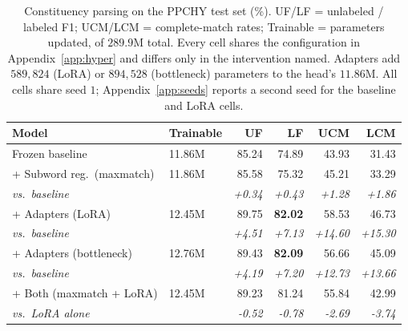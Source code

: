 \documentclass[11pt]{article}
\begin{document}
\begin{table}[t]
\centering
\small
\setlength{\tabcolsep}{5pt}
\begin{tabular}{@{}llrrrr@{}}
\toprule
\textbf{Model} & \textbf{Trainable} & \textbf{UF} & \textbf{LF} & \textbf{UCM} & \textbf{LCM} \\
\midrule
Frozen baseline              & 11.86M & 85.24 & 74.89 & 43.93 & 31.43 \\
\midrule
+ Subword reg.\ (maxmatch)   & 11.86M & 85.58 & 75.32 & 45.21 & 33.29 \\
\quad \emph{vs.\ baseline}   &        & \emph{+0.34} & \emph{+0.43} & \emph{+1.28} & \emph{+1.86} \\
\midrule
+ Adapters (LoRA)            & 12.45M & 89.75 & \textbf{82.02} & 58.53 & 46.73 \\
\quad \emph{vs.\ baseline}   &        & \emph{+4.51} & \emph{+7.13} & \emph{+14.60} & \emph{+15.30} \\
+ Adapters (bottleneck)      & 12.76M & 89.43 & \textbf{82.09} & 56.66 & 45.09 \\
\quad \emph{vs.\ baseline}   &        & \emph{+4.19} & \emph{+7.20} & \emph{+12.73} & \emph{+13.66} \\
\midrule
+ Both (maxmatch + LoRA)     & 12.45M & 89.23 & 81.24 & 55.84 & 42.99 \\
\quad \emph{vs.\ LoRA alone}  &        & \emph{-0.52} & \emph{-0.78} & \emph{-2.69} & \emph{-3.74} \\
\bottomrule
\end{tabular}
\caption{Constituency parsing on the PPCHY test set (\%). UF/LF = unlabeled /
labeled F1; UCM/LCM = complete-match rates; Trainable = parameters updated, of
$289.9$M total. Every cell shares the configuration in
Appendix~\ref{app:hyper} and differs only in the intervention named.
Adapters add $589{,}824$ (LoRA) or $894{,}528$ (bottleneck) parameters
to the head's $11.86$M. All cells share seed $1$;
Appendix~\ref{app:seeds} reports a second seed for the baseline and LoRA cells.}
\label{tab:main}
\end{table}
\end{document}
